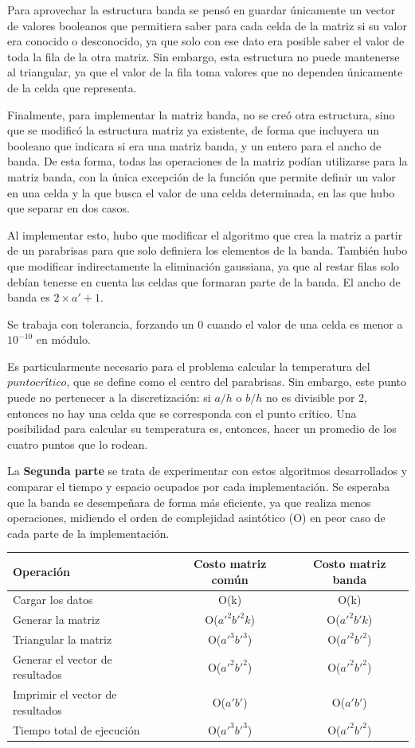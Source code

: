 \documentclass[a4paper]{article}
\begin{document}
Para aprovechar la estructura banda se pensó en guardar únicamente un vector de valores booleanos que permitiera saber para cada celda de la matriz si su valor era conocido o desconocido, ya que solo con ese dato era posible saber el valor de toda la fila de la otra matriz. Sin embargo, esta estructura no puede mantenerse al triangular, ya que el valor de la fila toma valores que no dependen únicamente de la celda que representa. 

Finalmente, para implementar la matriz banda, no se creó otra estructura, sino que se modificó la estructura matriz ya existente, de forma que incluyera un booleano que indicara si era una matriz banda, y un entero para el ancho de banda. De esta forma, todas las operaciones de la matriz podían utilizarse para la matriz banda, con la única excepción de la función que permite definir un valor en una celda y la que busca el valor de una celda determinada, en las que hubo que separar en dos casos.

Al implementar esto, hubo que modificar el algoritmo que crea la matriz a partir de un parabrisas para que solo definiera los elementos de la banda. También hubo que modificar indirectamente la eliminación gaussiana, ya que al restar filas solo debían tenerse en cuenta las celdas que formaran parte de la banda. El ancho de banda es $2 \times a' + 1$.

Se trabaja con tolerancia, forzando un 0 cuando el valor de una celda es menor a $10^{-10}$ en módulo.

Es particularmente necesario para el problema calcular la temperatura del $punto cr$í$tico$, que se define como el centro del parabrisas. Sin embargo, este punto puede no pertenecer a la discretización: si $a/h$ o $b/h$ no es divisible por 2, entonces no hay una celda que se corresponda con el punto crítico. Una posibilidad para calcular su temperatura es, entonces, hacer un promedio de los cuatro puntos que lo rodean.

La \textbf{Segunda parte} se trata de experimentar con estos algoritmos desarrollados y comparar el tiempo y espacio ocupados por cada implementación. Se esperaba que la banda se desempeñara de forma más eficiente, ya que realiza menos operaciones, midiendo el orden de complejidad asintótico (O) en peor caso de cada parte de la implementación. \newline 
 
\begin{tabular}{ l|c c }
  Operación & Costo matriz común & Costo matriz banda \\
 \hline
  Cargar los datos & O(k) & O(k)  \\
  Generar la matriz & O($a'^2b'^2k$) & O($a'^2b'k$) \\
  Triangular la matriz & O($a'^3b'^3$) & O($a'^2b'^2$) \\
  Generar el vector de resultados & O($a'^2b'^2$) & O($a'^2b'^2$)\\
  Imprimir el vector de resultados & O($a'b'$) & O($a'b'$)\\
  Tiempo total de ejecución & O($a'^3b'^3$) & O($a'^2b'^2$)
\end{tabular} \\ \\
\end{document}
